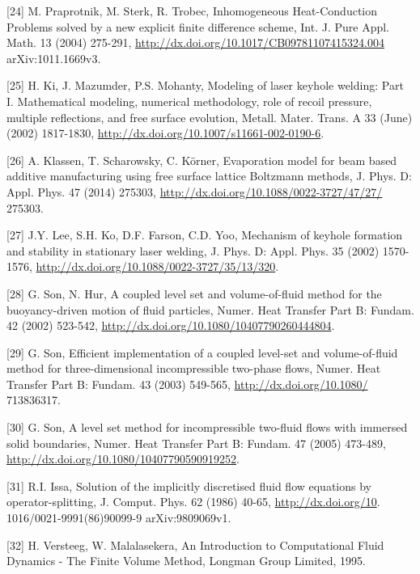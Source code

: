 \documentclass[10pt]{article}
\begin{document}
[24] M. Praprotnik, M. Sterk, R. Trobec, Inhomogeneous Heat-Conduction Problems solved by a new explicit finite difference scheme, Int. J. Pure Appl. Math. 13 (2004) 275-291, \href{http://dx.doi.org/10.1017/CB09781107415324.004}{http://dx.doi.org/10.1017/CB09781107415324.004} arXiv:1011.1669v3.

[25] H. Ki, J. Mazumder, P.S. Mohanty, Modeling of laser keyhole welding: Part I. Mathematical modeling, numerical methodology, role of recoil pressure, multiple reflections, and free surface evolution, Metall. Mater. Trans. A 33 (June) (2002) 1817-1830, \href{http://dx.doi.org/10.1007/s11661-002-0190-6}{http://dx.doi.org/10.1007/s11661-002-0190-6}.

[26] A. Klassen, T. Scharowsky, C. Körner, Evaporation model for beam based additive manufacturing using free surface lattice Boltzmann methods, J. Phys. D: Appl. Phys. 47 (2014) 275303, \href{http://dx.doi.org/10.1088/0022-3727/47/27/}{http://dx.doi.org/10.1088/0022-3727/47/27/} 275303.

[27] J.Y. Lee, S.H. Ko, D.F. Farson, C.D. Yoo, Mechanism of keyhole formation and stability in stationary laser welding, J. Phys. D: Appl. Phys. 35 (2002) 1570-1576, \href{http://dx.doi.org/10.1088/0022-3727/35/13/320}{http://dx.doi.org/10.1088/0022-3727/35/13/320}.

[28] G. Son, N. Hur, A coupled level set and volume-of-fluid method for the buoyancy-driven motion of fluid particles, Numer. Heat Transfer Part B: Fundam. 42 (2002) 523-542, \href{http://dx.doi.org/10.1080/10407790260444804}{http://dx.doi.org/10.1080/10407790260444804}.

[29] G. Son, Efficient implementation of a coupled level-set and volume-of-fluid method for three-dimensional incompressible two-phase flows, Numer. Heat Transfer Part B: Fundam. 43 (2003) 549-565, \href{http://dx.doi.org/10.1080/}{http://dx.doi.org/10.1080/} 713836317.

[30] G. Son, A level set method for incompressible two-fluid flows with immersed solid boundaries, Numer. Heat Transfer Part B: Fundam. 47 (2005) 473-489, \href{http://dx.doi.org/10.1080/10407790590919252}{http://dx.doi.org/10.1080/10407790590919252}.

[31] R.I. Issa, Solution of the implicitly discretised fluid flow equations by operator-splitting, J. Comput. Phys. 62 (1986) 40-65, \href{http://dx.doi.org/10}{http://dx.doi.org/10}. 1016/0021-9991(86)90099-9 arXiv:9809069v1.

[32] H. Versteeg, W. Malalasekera, An Introduction to Computational Fluid Dynamics - The Finite Volume Method, Longman Group Limited, 1995.
\end{document}
